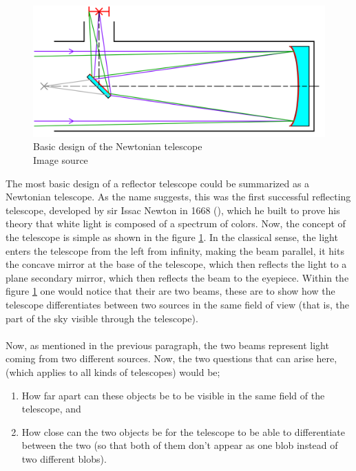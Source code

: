 \documentclass[a4paper,twoside]{article}
\numberwithin{equation}{section}
\begin{document}
\paragraph{}
\begin{figure}
\begin{center}
\includegraphics[width=1\linewidth]{fig6.png} 
\caption{Basic design of the Newtonian telescope \\ Image source \cite{newttele2}}
\label{fig6}
\end{center}
\end{figure}
The most basic design of a reflector telescope could be summarized as a Newtonian telescope. As the name suggests, this was the first successful reflecting telescope, developed by sir Issac Newton in 1668 (\cite{newttele1}), which he built to prove his theory that white light is composed of a spectrum of colors. Now, the concept of the telescope is simple as shown in the figure \ref{fig6}. In the classical sense, the light enters the telescope from the left from infinity, making the beam parallel, it hits the concave mirror at the base of the telescope, which then reflects the light to a plane secondary mirror, which then reflects the beam to the eyepiece. Within the figure \ref{fig6} one would notice that their are two beams, these are to show how the telescope differentiates between two sources in the same field of view (that is, the part of the sky visible through the telescope).
\paragraph{}
Now, as mentioned in the previous paragraph, the two beams represent light coming from two different sources. Now, the two questions that can arise here, (which applies to all kinds of telescopes) would be;
\begin{enumerate}
\item How far apart can these objects be to be visible in the same field of the telescope, and 
\item How close can the two objects be for the telescope to be able to differentiate between the two (so that both of them don't appear as one blob instead of two different blobs).
\end{enumerate}
\end{document}
